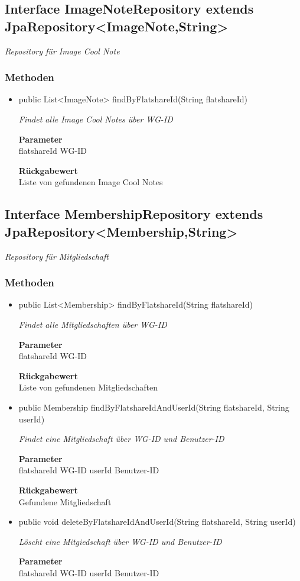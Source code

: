 \documentclass[a4paper]{scrreprt}
\begin{document}
    \subsection{Interface ImageNoteRepository extends JpaRepository<ImageNote,String>}
    \textit{Repository für Image Cool Note}
    \subsubsection{Methoden}
    \begin{itemize}
    	\item{public List<ImageNote> findByFlatshareId(String flatshareId)}
    	
    	\textit{Findet alle Image Cool Notes über WG-ID}
    	
    	\textbf{Parameter} \\
    	flatshareId WG-ID
    	
    	\textbf{Rückgabewert} \\
    	Liste von gefundenen Image Cool Notes
    \end{itemize}
    \subsection{Interface MembershipRepository extends JpaRepository<Membership,String>}
    \textit{Repository für Mitgliedschaft}
    \subsubsection{Methoden}
    \begin{itemize}
    	\item{public List<Membership> findByFlatshareId(String flatshareId)}
    	
    	\textit{Findet alle Mitgliedschaften über WG-ID}
    	
    	\textbf{Parameter} \\
    	flatshareId WG-ID
    	
    	\textbf{Rückgabewert} \\
    	Liste von gefundenen Mitgliedschaften        \item{public Membership findByFlatshareIdAndUserId(String flatshareId, String userId)}
    	
    	\textit{Findet eine Mitgliedschaft über WG-ID und Benutzer-ID}
    	
    	\textbf{Parameter} \\
    	flatshareId WG-ID
    	userId Benutzer-ID
    	
    	\textbf{Rückgabewert} \\
    	Gefundene Mitgliedschaft        \item{public void deleteByFlatshareIdAndUserId(String flatshareId, String userId)}
    	
    	\textit{Löscht eine Mitgiedschaft über WG-ID und Benutzer-ID}
    	
    	\textbf{Parameter} \\
    	flatshareId WG-ID
    	userId Benutzer-ID
    	
    	
    \end{itemize}
\end{document}
